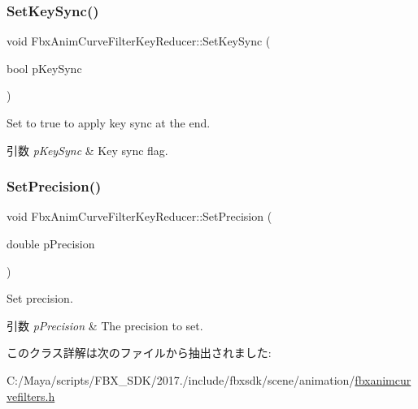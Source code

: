 \subsubsection{\texorpdfstring{Set\+Key\+Sync()}{SetKeySync()}}
{\footnotesize\ttfamily void Fbx\+Anim\+Curve\+Filter\+Key\+Reducer\+::\+Set\+Key\+Sync (\begin{DoxyParamCaption}\item[{bool}]{p\+Key\+Sync }\end{DoxyParamCaption})}

Set to {\ttfamily true} to apply key sync at the end. 
\begin{DoxyParams}{引数}
{\em p\+Key\+Sync} & Key sync flag. \\
\hline
\end{DoxyParams}
\mbox{\label{class_fbx_anim_curve_filter_key_reducer_a36e172b2c259e383897828f10036e277}} 
\subsubsection{\texorpdfstring{Set\+Precision()}{SetPrecision()}}
{\footnotesize\ttfamily void Fbx\+Anim\+Curve\+Filter\+Key\+Reducer\+::\+Set\+Precision (\begin{DoxyParamCaption}\item[{double}]{p\+Precision }\end{DoxyParamCaption})}

Set precision. 
\begin{DoxyParams}{引数}
{\em p\+Precision} & The precision to set. \\
\hline
\end{DoxyParams}


このクラス詳解は次のファイルから抽出されました\+:\begin{DoxyCompactItemize}
\item 
C\+:/\+Maya/scripts/\+F\+B\+X\+\_\+\+S\+D\+K/2017./include/fbxsdk/scene/animation/\hyperlink{fbxanimcurvefilters_8h}{fbxanimcurvefilters.\+h}\end{DoxyCompactItemize}
